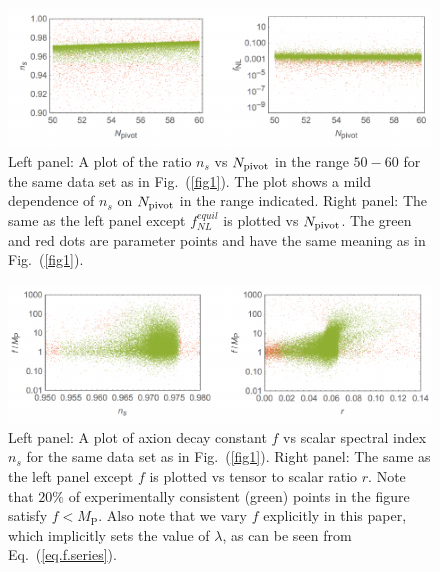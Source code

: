 \documentclass[a4paper,11pt]{article}
\begin{document}
  \begin{figure}
    \centering
    \includegraphics[width=1.0\textwidth]{figs/fig2.pdf}
    \caption{Left panel: A plot of the ratio $n_s$ vs $N_{\rm pivot}$ in the range $50-60$ for the same data set as in Fig.~(\ref{fig1}).
    The plot shows a mild dependence of $n_s$ on $N_{\rm pivot}$ in the range indicated. Right panel: The same as the left panel except
    $f^{equil}_{NL}$ is plotted vs $N_{\rm pivot}$.
    The green and red dots are parameter points and have the same meaning as in Fig.~(\ref{fig1}).}
    \label{fig2}
  \end{figure}

  \begin{figure}
    \centering
    \includegraphics[width=1.0\textwidth]{figs/fig4.pdf}
    \caption{Left panel: A plot of axion decay constant $f$ vs scalar spectral index $n_s$ for the
      same data set as in Fig.~(\ref{fig1}).
          Right panel: The same as the left panel except $f$ is plotted vs tensor to scalar ratio
      $r$.
          Note that $20\%$ of experimentally consistent (green) points in the figure satisfy
      $f<M_\text{P}$. Also note that we vary $f$ explicitly in this paper, which implicitly sets
      the value of $\lambda$, as can be seen from Eq.~(\ref{eq.f.series}).}
    \label{fig4}
  \end{figure}
\end{document}
